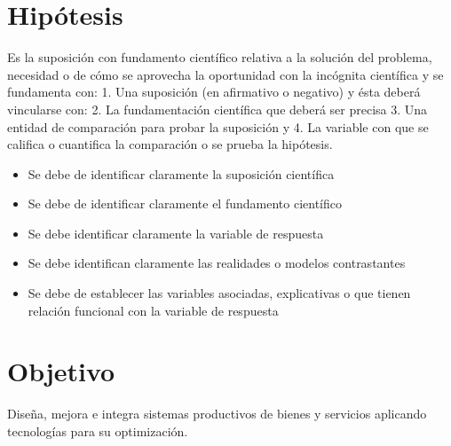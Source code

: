     \section{Hipótesis}
    
    Es la suposición con fundamento científico relativa a la solución del problema, necesidad o de cómo se aprovecha la oportunidad con la incógnita científica y se fundamenta con: 1. Una suposición (en afirmativo o negativo) y ésta deberá vincularse con:
    2. La fundamentación científica que deberá ser precisa 3. Una entidad de comparación para probar la suposición y
    4. La variable con que se califica o cuantifica la comparación o se prueba la hipótesis.
    
    \begin{itemize}
        \item Se debe de identificar claramente la suposición científica
        \item Se debe de identificar claramente el fundamento científico
        \item Se debe identificar claramente la variable de respuesta
        \item Se debe identifican claramente las realidades o modelos contrastantes
        \item Se debe de establecer las variables asociadas, explicativas o que tienen relación funcional con la variable de respuesta
    \end{itemize}
    \section{Objetivo}
    
    Diseña, mejora e integra sistemas productivos de bienes y servicios aplicando tecnologías para su optimización.
    
    
